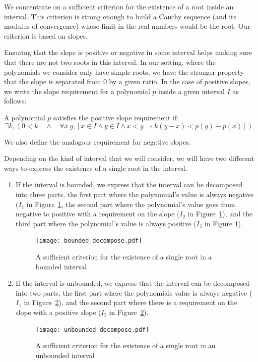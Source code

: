 \documentclass{mscs}
\begin{document}
We concentrate on a sufficient criterion for the existence of a root
inside an interval.  This criterion is strong enough to build a Cauchy
sequence (and its modulus of convergence) whose limit in the real numbers
would be the root. Our criterion is based on slopes.

Ensuring that the slope is positive or negative in some interval helps
making sure that there are not two roots in this interval.  In our
setting, where the polynomials we consider only have simple roots, we
have the stronger
property that the slope is separated from 0 by a given ratio.  In the
case of positive slopes, we write the slope requirement for a
polynomial \(p\) inside a given interval \(I\) as follows:
\begin{definition}
A polynomial $p$ satisfies the positive slope requirement if:
\[\exists k, (0 < k \quad \wedge \quad \forall x\ y, [x \in I \wedge y \in I
\wedge x < y \Rightarrow k(y - x) < p(y) - p (x)]) \]
\end{definition}
We also define the analogous requirement for negative slopes.

Depending on the kind of interval that we will consider, we will have
two different ways to express the existence of a single root in the
interval.

\begin{enumerate}
\item If the interval is bounded, we express that the interval can be
  decomposed into three parts, the first part where the polynomial's
  value is always negative (\(I_1\) in Figure~\ref{bounded_decompose},
  the second part where the polynomial's
  value goes from negative to positive with a requirement on the
  slope (\(I_2\) in Figure~\ref{bounded_decompose}), and the third
  part where the polynomial's value is always
  positive (\(I_3\) in Figure \ref{bounded_decompose}).
\begin{figure}[h]
\begin{center}
\texttt{[image: bounded\_decompose.pdf]}
\end{center}
\caption{\label{bounded_decompose} A sufficient criterion for the existence of a single root in a bounded interval}
\end{figure}
\item If the interval is unbounded, we express that the interval can
  be decomposed into two parts, the first part where the polynomials
  value is always negative (\(I_1\) in
  Figure~\ref{unbounded_decompose}), and the second part where there is
  a requirement on the slope with a positive slope (\(I_2\) in
  Figure~\ref{unbounded_decompose}).
\begin{figure}[h]
\begin{center}
\texttt{[image: unbounded\_decompose.pdf]}
\end{center}
\caption{\label{unbounded_decompose} A sufficient criterion for the existence of a single root in an unbounded interval}
\end{figure}
\end{enumerate}
\end{document}
